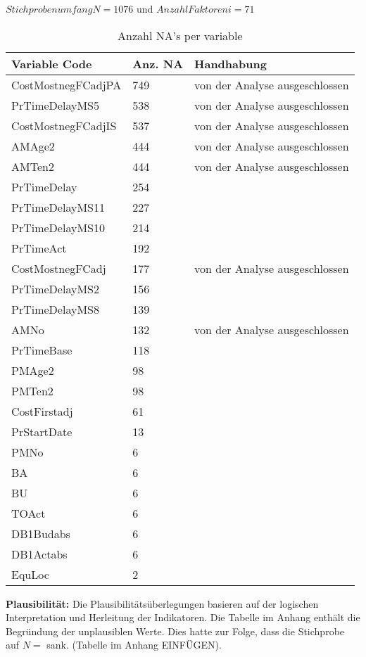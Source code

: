 \newline\newline $Stichprobenumfang N = 1076$ und $Anzahl Faktoren i = 71$
\newline\newline
\begin{table}[h]
	\centering
	\caption{Anzahl NA's per variable}
	\begin{tabular} {| l| l | p{6cm} |}
		\textbf{Variable Code} & \textbf{Anz. NA} & \textbf{Handhabung} \\\hline
		CostMostnegFCadjPA & 749   & von der Analyse ausgeschlossen \\
		PrTimeDelayMS5 & 538   & von der Analyse ausgeschlossen \\
		CostMostnegFCadjIS & 537   & von der Analyse ausgeschlossen \\
		AMAge2 & 444   & von der Analyse ausgeschlossen \\
		AMTen2 & 444   & von der Analyse ausgeschlossen \\
		PrTimeDelay & 254   &  \\
		PrTimeDelayMS11 & 227   &  \\
		PrTimeDelayMS10 & 214   &  \\
		PrTimeAct & 192   &  \\
		CostMostnegFCadj & 177   & von der Analyse ausgeschlossen \\
		PrTimeDelayMS2 & 156   &  \\
		PrTimeDelayMS8 & 139   &  \\
		AMNo  & 132   & von der Analyse ausgeschlossen \\
		PrTimeBase & 118   &  \\
		PMAge2 & 98    &  \\
		PMTen2 & 98    &  \\
		CostFirstadj & 61    &  \\
		PrStartDate & 13    &  \\
		PMNo  & 6     &  \\
		BA    & 6     &  \\
		BU    & 6     &  \\
		TOAct & 6     &  \\
		DB1Budabs & 6     &  \\
		DB1Actabs & 6     &  \\
		EquLoc & 2     &  \\	
	\end{tabular}
\end{table}
\newline
\newline\textbf{Plausibilität:} Die Plausibilitätsüberlegungen basieren auf der logischen Interpretation und Herleitung der Indikatoren. Die Tabelle im Anhang enthält die Begründung der unplausiblen Werte. Dies hatte zur Folge, dass die Stichprobe auf $N = $ sank. (Tabelle im Anhang EINFÜGEN).
